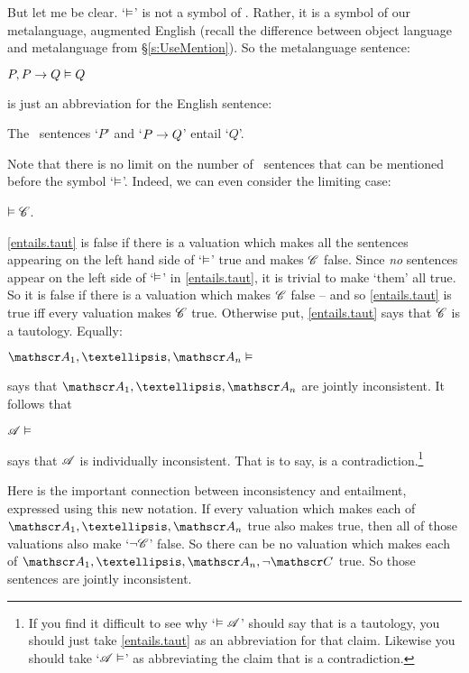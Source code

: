 But let me be clear. `$\vDash$' is not a symbol of \TFL. Rather, it is a symbol of our metalanguage, augmented English (recall the difference between object language and metalanguage from §\ref{s:UseMention}). So the metalanguage sentence:
	\begin{earg}
		\item[\ex{turnstile}] $P, P \rightarrow Q \vDash Q$
	\end{earg}
is just an abbreviation for the English sentence: 
	\begin{earg}
		\item[\ex{turnstile.trans}] The \TFL\ sentences `$P$' and `$P \rightarrow Q$' entail `$Q$'.
	\end{earg}
Note that there is no limit on the number of \TFL\ sentences that can be mentioned before the symbol `$\vDash$'. Indeed, we can even consider the limiting case:
	\begin{earg}
	\item[\ex{entails.taut}] $\vDash \mathscr{C}$.\end{earg}
\ref{entails.taut}  is false if there is a valuation which makes all the sentences appearing on the left hand side of `$\vDash$' true and makes $\mathscr{C}$ false. Since \emph{no} sentences appear on the left side of `$\vDash$' in \ref{entails.taut}, it is trivial to make `them' all true. So it is false if there is a valuation which makes $\mathscr{C}$ false – and so \ref{entails.taut} is true iff every valuation makes $\mathscr{C}$ true. Otherwise put, \ref{entails.taut} says that $\mathscr{C}$ is a tautology. Equally:
	\begin{earg}
		\item[\ex{incon.entails}] $\meta{A}_{1},…,\meta{A}_{n} \entails$
	\end{earg}
says that $\meta{A}_{1},…,\meta{A}_{n}$ are jointly inconsistent. It follows that
	\begin{earg}
		\item[\ex{cont.entails}] $\mathscr{A} \vDash$
	\end{earg}
says that $\mathscr{A}$ is individually inconsistent. That is to say,  is a contradiction.\footnote{If you find it difficult to see why `$\vDash\mathscr{A}$' should say that  is a tautology, you should just take \ref{entails.taut} as an abbreviation for that claim. Likewise you should take  `$\mathscr{A}\vDash$' as abbreviating the claim that  is a contradiction.}

Here is the important connection between inconsistency and entailment, expressed using this new notation.  If every valuation which makes each of $\meta{A}_{1},…,\meta{A}_{n}$ true also makes  true, then all of those valuations also make `$\neg\mathscr{C}$' false. So there can be no valuation which makes each of $\meta{A}_{1}, …, \meta{A}_{n}, \enot\meta{C}$ true. So those sentences are jointly inconsistent.

